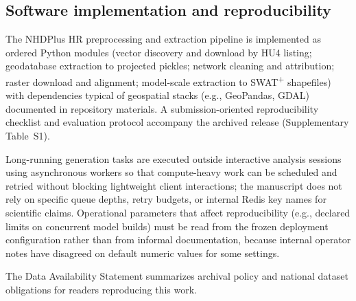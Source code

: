 \subsection{Software implementation and reproducibility}
\label{sec:methods-software}

The NHDPlus HR preprocessing and extraction pipeline is implemented as ordered Python modules (vector discovery and download by HU4 listing; geodatabase extraction to projected pickles; network cleaning and attribution; raster download and alignment; model-scale extraction to SWAT\textsuperscript{+} shapefiles) with dependencies typical of geospatial stacks (e.g., GeoPandas, GDAL) documented in repository materials.
A submission-oriented reproducibility checklist and evaluation protocol accompany the archived release (Supplementary Table~S1).

Long-running generation tasks are executed outside interactive analysis sessions using asynchronous workers so that compute-heavy work can be scheduled and retried without blocking lightweight client interactions; the manuscript does not rely on specific queue depths, retry budgets, or internal Redis key names for scientific claims.
Operational parameters that affect reproducibility (e.g., declared limits on concurrent model builds) must be read from the frozen deployment configuration rather than from informal documentation, because internal operator notes have disagreed on default numeric values for some settings.

The Data Availability Statement summarizes archival policy and national dataset obligations for readers reproducing this work.
